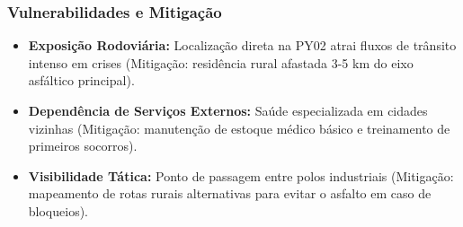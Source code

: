\subsubsection{Vulnerabilidades e
Mitigação}

\begin{itemize}
\tightlist
\item
  \textbf{Exposição Rodoviária:} Localização direta na PY02 atrai fluxos
  de trânsito intenso em crises (Mitigação: residência rural afastada
  3-5 km do eixo asfáltico principal).
\item
  \textbf{Dependência de Serviços Externos:} Saúde especializada em
  cidades vizinhas (Mitigação: manutenção de estoque médico básico e
  treinamento de primeiros socorros).
\item
  \textbf{Visibilidade Tática:} Ponto de passagem entre polos
  industriais (Mitigação: mapeamento de rotas rurais alternativas para
  evitar o asfalto em caso de bloqueios).
\end{itemize}


